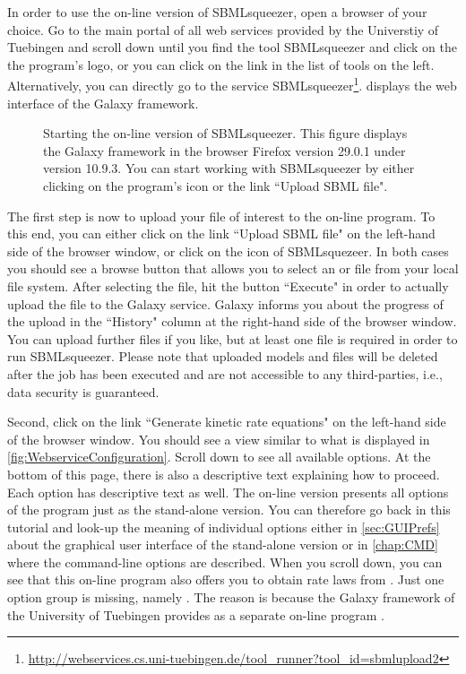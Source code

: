 In order to use the on-line version of SBMLsqueezer, open a browser of your choice.
Go to the main portal of all web services provided by the Universtiy of Tuebingen
and scroll down until you find the tool SBMLsqueezer and click on the the program's logo, or you can click on the link in the list of tools on the left.
Alternatively, you can directly go to the service SBMLsqueezer\footnote{\url{http://webservices.cs.uni-tuebingen.de/tool_runner?tool_id=sbmlupload2}}.
 displays the web interface of the Galaxy framework.
\begin{figure}
\caption[Starting the on-line version of SBMLsqueezer]{Starting the on-line version of SBMLsqueezer.
This figure displays the Galaxy framework in the browser Firefox version 29.0.1 under \MacOSX version 10.9.3.
You can start working with SBMLsqueezer by either clicking on the program's icon or the link ``Upload SBML file".}
\label{fig:WebserviceLaunch}
\end{figure}

The first step is now to upload your \SBML file of interest to the on-line program.
To this end, you can either click on the link ``Upload SBML file" on the left-hand side of the browser window, or click on the icon of SBMLsquezeer.
In both cases you should see a browse button that allows you to select an \XML or \SBML file from your local file system.
After selecting the file, hit the button ``Execute" in order to actually upload the file to the Galaxy service.
Galaxy informs you about the progress of the upload in the ``History" column at the right-hand side of the browser window.
You can upload further files if you like, but at least one file is required in order to run SBMLsqueezer.
Please note that uploaded models and files will be deleted after the job has been executed and are not accessible to any third-parties, i.e., data security is guaranteed.

Second, click on the link ``Generate kinetic rate equations" on the left-hand side of the browser window.
You should see a view similar to what is displayed in \vref{fig:WebserviceConfiguration}.
Scroll down to see all available options.
At the bottom of this page, there is also a descriptive text explaining how to proceed.
Each option has descriptive text as well.
The on-line version presents all options of the program just as the stand-alone version.
You can therefore go back in this tutorial and look-up the meaning of individual options either in \vref{sec:GUIPrefs} about the graphical user interface of the stand-alone version or in \vref{chap:CMD} where the command-line options are described.
When you scroll down, you can see that this on-line program also offers you to obtain rate laws from \SABIO.
Just one option group is missing, namely \SBMLLaTeX.
The reason is because the Galaxy framework of the University of Tuebingen provides \SBMLLaTeX as a separate on-line program \citep{Draeger2009b}.

